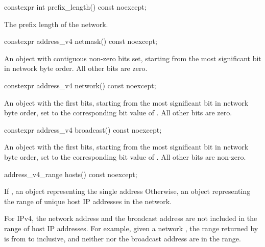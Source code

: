 \begin{itemdecl}
constexpr int prefix_length() const noexcept;
\end{itemdecl}

\begin{itemdescr}
\pnum
\returns The prefix length of the network.
\end{itemdescr}

\begin{itemdecl}
constexpr address_v4 netmask() const noexcept;
\end{itemdecl}

\begin{itemdescr}
\pnum
\returns An  object with  contiguous non-zero bits set, starting from the most significant bit in network byte order. All other bits are zero.
\end{itemdescr}

\begin{itemdecl}
constexpr address_v4 network() const noexcept;
\end{itemdecl}

\begin{itemdescr}
\pnum
\returns An  object with the first  bits, starting from the most significant bit in network byte order, set to the corresponding bit value of . All other bits are zero.
\end{itemdescr}

\begin{itemdecl}
constexpr address_v4 broadcast() const noexcept;
\end{itemdecl}

\begin{itemdescr}
\pnum
\returns An  object with the first  bits, starting from the most significant bit in network byte order, set to the corresponding bit value of . All other bits are non-zero.
\end{itemdescr}

\begin{itemdecl}
address_v4_range hosts() const noexcept;
\end{itemdecl}

\begin{itemdescr}
\pnum
\returns If , an  object representing the single address  Otherwise, an  object representing the range of unique host IP addresses in the network.

\pnum
\enternote For IPv4, the network address and the broadcast address are not included in the range of host IP addresses. For example, given a network , the range returned by  is from  to  inclusive, and neither  nor the broadcast address  are in the range. \exitnote
\end{itemdescr}

